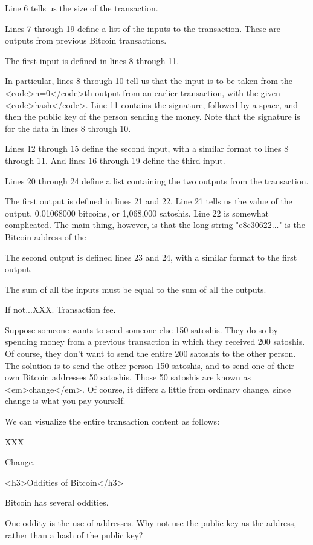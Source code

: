 Line 6 tells us the size of the transaction.

Lines 7 through 19 define a list of the inputs to the transaction.
These are outputs from previous Bitcoin transactions.

The first input is defined in lines 8 through 11.  

In particular, lines 8 through 10 tell us that the input is to be
taken from the <code>n=0</code>th output from an earlier transaction,
with the given <code>hash</code>.  Line 11 contains the signature,
followed by a space, and then the public key of the person sending the
money.  Note that the signature is for the data in lines 8 through 10.

Lines 12 through 15 define the second input, with a similar format to
lines 8 through 11.  And lines 16 through 19 define the third input.

Lines 20 through 24 define a list containing the two outputs from the
transaction.

The first output is defined in lines 21 and 22.  Line 21 tells us the
value of the output, 0.01068000 bitcoins, or 1,068,000 satoshis.  Line
22 is somewhat complicated.  The main thing, however, is that the long
string "e8c30622..." is the Bitcoin address of the 

The second output is defined lines 23 and 24, with a similar format to
the first output.

The sum of all the inputs must be equal to the sum of all the outputs.

If not...XXX.  Transaction fee.

Suppose someone wants to send someone else 150 satoshis.  They do so
by spending money from a previous transaction in which they received
200 satoshis.  Of course, they don't want to send the entire 200
satoshis to the other person.  The solution is to send the other
person 150 satoshis, and to send one of their own Bitcoin addresses 50
satoshis.  Those 50 satoshis are known as <em>change</em>.  Of course,
it differs a little from ordinary change, since change is what you pay
yourself.

We can visualize the entire transaction content as follows:

XXX



Change.

<h3>Oddities of Bitcoin</h3>

Bitcoin has several oddities.

One oddity is the use of addresses.  Why not use the public key as the
address, rather than a hash of the public key?

